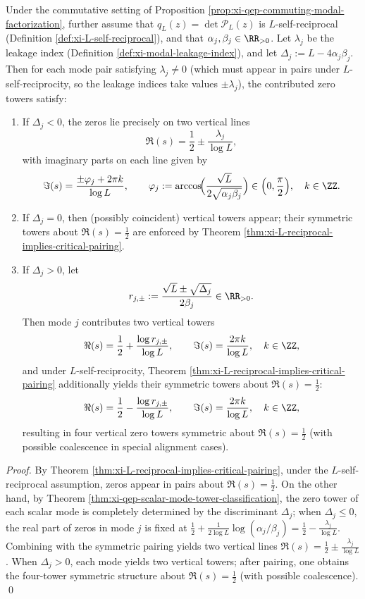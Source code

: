 \begin{corollary}\label{cor:xi-qep-leakage-spectrum-commuting}
Under the commutative setting of Proposition \ref{prop:xi-qep-commuting-modal-factorization}, further assume that \(q_L(z)=\det \mathcal{P}_L(z)\) is \(L\)-self-reciprocal (Definition \ref{def:xi-L-self-reciprocal}), and that \(\alpha_j,\beta_j\in\RR_{>0}\).
Let \(\lambda_j\) be the leakage index (Definition \ref{def:xi-modal-leakage-index}), and let \(\Delta_j:=L-4\alpha_j\beta_j\).
Then for each mode pair satisfying \(\lambda_j\neq 0\) (which must appear in pairs under \(L\)-self-reciprocity, so the leakage indices take values \(\pm\lambda_j\)), the contributed zero towers satisfy:
\begin{enumerate}
  \item If \(\Delta_j<0\), the zeros lie precisely on two vertical lines
  \[
  \Re(s)=\frac12\pm\frac{\lambda_j}{\log L},
  \]
  with imaginary parts on each line given by
  \[
  \Im(s)=\frac{\pm\varphi_j+2\pi k}{\log L},
  \qquad
  \varphi_j:=\arccos\!\Bigl(\frac{\sqrt L}{2\sqrt{\alpha_j\beta_j}}\Bigr)\in\Bigl(0,\frac{\pi}{2}\Bigr),
  \quad k\in\ZZ.
  \]
  \item If \(\Delta_j=0\), then (possibly coincident) vertical towers appear; their symmetric towers about \(\Re(s)=\tfrac12\) are enforced by Theorem \ref{thm:xi-L-reciprocal-implies-critical-pairing}.
  \item If \(\Delta_j>0\), let
  \[
  r_{j,\pm}:=\frac{\sqrt L\pm\sqrt{\Delta_j}}{2\beta_j}\in\RR_{>0}.
  \]
  Then mode \(j\) contributes two vertical towers
  \[
  \Re(s)=\frac12+\frac{\log r_{j,\pm}}{\log L},
  \qquad
  \Im(s)=\frac{2\pi k}{\log L},
  \quad k\in\ZZ,
  \]
  and under \(L\)-self-reciprocity, Theorem \ref{thm:xi-L-reciprocal-implies-critical-pairing} additionally yields their symmetric towers about \(\Re(s)=\tfrac12\):
  \[
  \Re(s)=\frac12-\frac{\log r_{j,\pm}}{\log L},
  \qquad
  \Im(s)=\frac{2\pi k}{\log L},
  \quad k\in\ZZ,
  \]
  resulting in four vertical zero towers symmetric about \(\Re(s)=\tfrac12\) (with possible coalescence in special alignment cases).
\end{enumerate}
\end{corollary}

\begin{proof}
By Theorem \ref{thm:xi-L-reciprocal-implies-critical-pairing}, under the \(L\)-self-reciprocal assumption, zeros appear in pairs about \(\Re(s)=\tfrac12\).
On the other hand, by Theorem \ref{thm:xi-qep-scalar-mode-tower-classification}, the zero tower of each scalar mode is completely determined by the discriminant \(\Delta_j\); when \(\Delta_j\le 0\), the real part of zeros in mode \(j\) is fixed at
\(
\frac12+\frac{1}{2\log L}\log(\alpha_j/\beta_j)=\frac12-\frac{\lambda_j}{\log L}
\).
Combining with the symmetric pairing yields two vertical lines \(\Re(s)=\frac12\pm\frac{\lambda_j}{\log L}\).
When \(\Delta_j>0\), each mode yields two vertical towers; after pairing, one obtains the four-tower symmetric structure about \(\Re(s)=\tfrac12\) (with possible coalescence). \qed
\end{proof}


